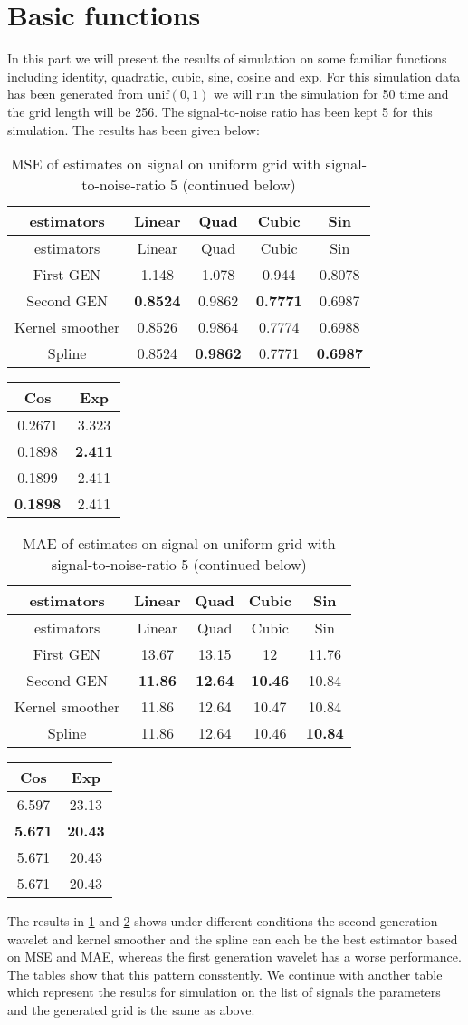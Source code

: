 \documentclass[12pt,twoside, a4paper]{reedthesis}
\begin{document}
\hypertarget{basic-functions}{%
\section{Basic functions}\label{basic-functions}}

In this part we will present the results of simulation on some familiar functions including identity, quadratic, cubic, sine, cosine and exp. For this simulation data has been generated from \(\text{unif}(0,1)\) we will run the simulation for 50 time and the grid length will be 256. The signal-to-noise ratio has been kept 5 for this simulation. The results has been given below:
\begin{longtable}[]{@{}ccccc@{}}
\caption{\label{tbl:msebasicunif5}MSE of estimates on signal on uniform grid with signal-to-noise-ratio 5 (continued below)}\tabularnewline
\toprule
estimators & Linear & Quad & Cubic & Sin\tabularnewline
\midrule
\endfirsthead
\toprule
estimators & Linear & Quad & Cubic & Sin\tabularnewline
\midrule
\endhead
First GEN & 1.148 & 1.078 & 0.944 & 0.8078\tabularnewline
Second GEN & \textbf{0.8524} & 0.9862 & \textbf{0.7771} & 0.6987\tabularnewline
Kernel smoother & 0.8526 & 0.9864 & 0.7774 & 0.6988\tabularnewline
Spline & 0.8524 & \textbf{0.9862} & 0.7771 & \textbf{0.6987}\tabularnewline
\bottomrule
\end{longtable}
\begin{longtable}[]{@{}cc@{}}
\toprule
Cos & Exp\tabularnewline
\midrule
\endhead
0.2671 & 3.323\tabularnewline
0.1898 & \textbf{2.411}\tabularnewline
0.1899 & 2.411\tabularnewline
\textbf{0.1898} & 2.411\tabularnewline
\bottomrule
\end{longtable}
\begin{longtable}[]{@{}ccccc@{}}
\caption{\label{tbl:maebasicunif5}MAE of estimates on signal on uniform grid with signal-to-noise-ratio 5 (continued below)}\tabularnewline
\toprule
estimators & Linear & Quad & Cubic & Sin\tabularnewline
\midrule
\endfirsthead
\toprule
estimators & Linear & Quad & Cubic & Sin\tabularnewline
\midrule
\endhead
First GEN & 13.67 & 13.15 & 12 & 11.76\tabularnewline
Second GEN & \textbf{11.86} & \textbf{12.64} & \textbf{10.46} & 10.84\tabularnewline
Kernel smoother & 11.86 & 12.64 & 10.47 & 10.84\tabularnewline
Spline & 11.86 & 12.64 & 10.46 & \textbf{10.84}\tabularnewline
\bottomrule
\end{longtable}
\begin{longtable}[]{@{}cc@{}}
\toprule
Cos & Exp\tabularnewline
\midrule
\endhead
6.597 & 23.13\tabularnewline
\textbf{5.671} & \textbf{20.43}\tabularnewline
5.671 & 20.43\tabularnewline
5.671 & 20.43\tabularnewline
\bottomrule
\end{longtable}
The results in \ref{tbl:msebasicunif5} and \ref{tbl:maebasicunif5} shows under different conditions the second generation wavelet and kernel smoother and the spline can each be the best estimator based on MSE and MAE, whereas the first generation wavelet has a worse performance. The tables show that this pattern consstently. We continue with another table which represent the results for simulation on the list of signals the parameters and the generated grid is the same as above.
\end{document}
